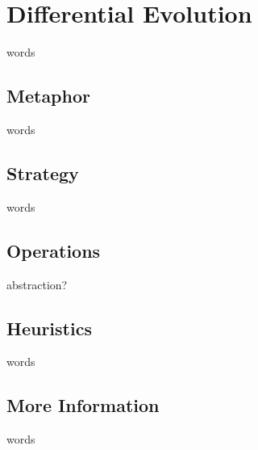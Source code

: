 %
%


%
%
\section{Differential Evolution}
words


%
%
\subsection{Metaphor}
words

%
%
\subsection{Strategy}
words


%
%
\subsection{Operations}
abstraction?


%
%
\subsection{Heuristics}
words

%
%
\subsection{More Information}
words


